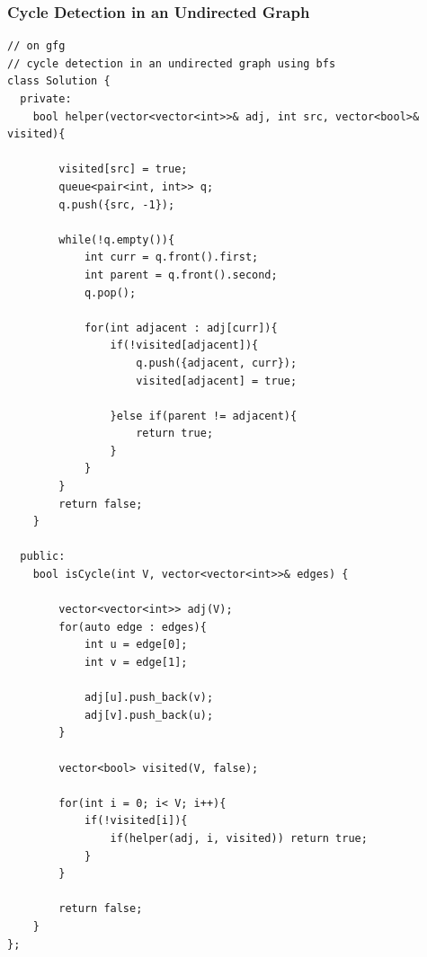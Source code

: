 \documentclass[11pt]{article}
\begin{document}
\subsubsection{Cycle Detection in an Undirected Graph}
\begin{minipage}{\linewidth}
\begin{lstlisting}
// on gfg
// cycle detection in an undirected graph using bfs
class Solution {
  private:
    bool helper(vector<vector<int>>& adj, int src, vector<bool>& visited){
        
        visited[src] = true;
        queue<pair<int, int>> q;
        q.push({src, -1});
        
        while(!q.empty()){
            int curr = q.front().first;
            int parent = q.front().second;
            q.pop();
            
            for(int adjacent : adj[curr]){
                if(!visited[adjacent]){
                    q.push({adjacent, curr});
                    visited[adjacent] = true;
                    
                }else if(parent != adjacent){
                    return true;  
                }
            }
        }
        return false;
    }
    
  public:
    bool isCycle(int V, vector<vector<int>>& edges) {
        
        vector<vector<int>> adj(V);
        for(auto edge : edges){
            int u = edge[0];
            int v = edge[1];
            
            adj[u].push_back(v);
            adj[v].push_back(u);
        }
        
        vector<bool> visited(V, false);
        
        for(int i = 0; i< V; i++){
            if(!visited[i]){
                if(helper(adj, i, visited)) return true;
            }
        }
        
        return false;
    }
};
\end{lstlisting}
\end{minipage}
\end{document}
